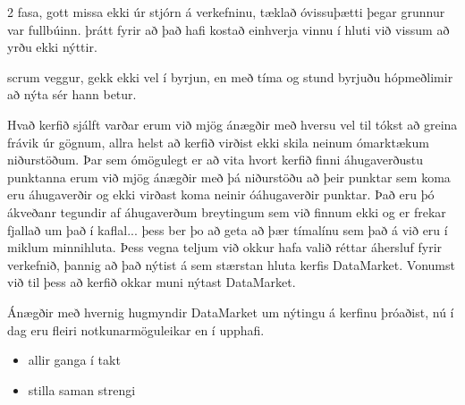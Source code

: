 \documentclass{article}
\begin{document}
2 fasa, gott missa ekki úr stjórn á verkefninu, tæklað óvissuþætti þegar grunnur var fullbúinn.
þrátt fyrir að það hafi kostað einhverja vinnu í hluti við vissum að yrðu ekki nýttir. 

scrum veggur, gekk ekki vel í byrjun, en með tíma og stund byrjuðu hópmeðlimir að nýta sér hann betur.

Hvað kerfið sjálft varðar erum við mjög ánægðir með hversu vel til tókst að greina frávik úr gögnum, allra helst að kerfið virðist ekki skila neinum ómarktækum niðurstöðum.
Þar sem ómögulegt er að vita hvort kerfið finni áhugaverðustu punktanna erum við mjög ánægðir með þá niðurstöðu að þeir punktar sem koma eru áhugaverðir og ekki virðast
koma neinir óáhugaverðir punktar. 
Það eru þó ákveðanr tegundir af áhugaverðum breytingum sem við finnum ekki og er frekar fjallað um það í kaflal... þess ber þo að geta að þær tímalínu sem það á við eru 
í miklum minnihluta. Þess vegna teljum við okkur hafa valið réttar áhersluf fyrir verkefnið, þannig að það nýtist á sem stærstan hluta kerfis DataMarket.
Vonumst við til þess að kerfið okkar muni nýtast DataMarket.

Ánægðir með hvernig hugmyndir DataMarket um nýtingu á kerfinu þróaðist, nú í dag eru fleiri notkunarmöguleikar en í upphafi.

\begin{itemize}
  \item allir ganga í takt
  \item stilla saman strengi
\end{itemize}
\end{document}
